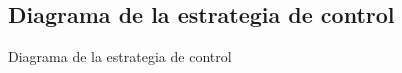 \subsection{Diagrama de la estrategia de control}
\label{Diagrama_control}

Diagrama de la estrategia de control
